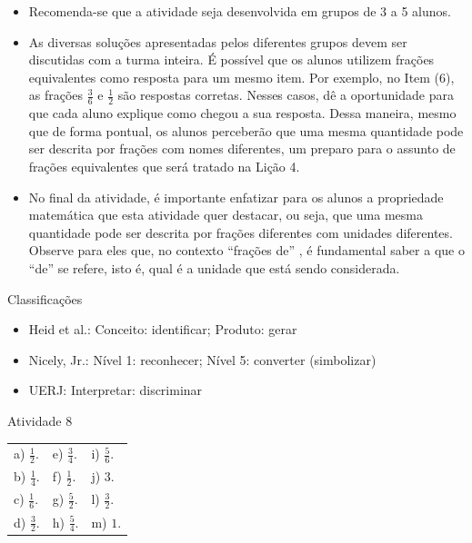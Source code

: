 \begin{multicols}{2}
  
  \vspace{.1cm}

  \begin{itemize} %
    \item       Recomenda-se que a atividade seja desenvolvida em grupos de 3 a 5 alunos.
    \item       As diversas soluções apresentadas pelos diferentes grupos devem ser discutidas com a turma inteira. É possível que os alunos utilizem frações equivalentes como resposta para um mesmo item. Por exemplo, no Item (6), as frações       $\frac{3}{6}$       e       $\frac{1}{2}$       são respostas corretas. Nesses casos, dê a oportunidade para que cada aluno explique como chegou a sua resposta. Dessa maneira, mesmo que de forma pontual, os alunos perceberão que uma mesma quantidade pode ser descrita por frações com nomes diferentes, um preparo para o assunto de frações equivalentes que será tratado na Lição 4.
    \item       No final da atividade, é importante enfatizar para os alunos a propriedade matemática que esta atividade quer destacar, ou seja, que uma mesma quantidade pode ser descrita por frações diferentes com unidades diferentes. Observe para eles que, no contexto       ``frações de''      , é fundamental saber a que o       ``de''       se refere, isto é, qual é a unidade que está sendo considerada.
\end{itemize} %


  Classificações
\begin{itemize} %
    \item       Heid et al.: Conceito: identificar; Produto: gerar
    \item       Nicely, Jr.: Nível 1: reconhecer; Nível 5: converter (simbolizar)
    \item       UERJ: Interpretar: discriminar
\end{itemize} %



\begin{resposta*}{Atividade 8}
\begin{tabular}{m{}m{}m{}}
    a) $\frac{1}{2}$. & e) $\frac{3}{4}$. &  i) $\frac{5}{6}$.\\
    b) $\frac{1}{4}$. & f) $\frac{1}{2}$. &  j) $3$.\\
    c) $\frac{1}{6}$. & g) $\frac{5}{2}$. &  l) $\frac{3}{2}$.\\
    d) $\frac{3}{2}$. & h) $\frac{5}{4}$. &  m) $1$.
\end{tabular} %


\end{resposta*}
\end{multicols}
